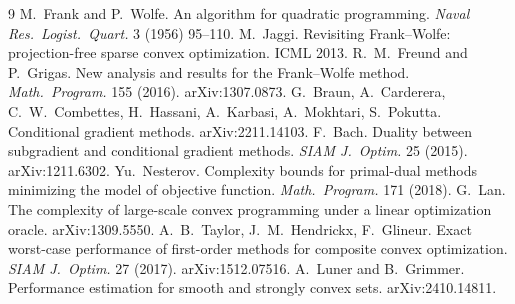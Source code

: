 \documentclass[11pt]{article}
\theoremstyle{remark}
\begin{document}
\begin{thebibliography}{9}
 M.~Frank and P.~Wolfe. An algorithm for quadratic programming.
\emph{Naval Res.\ Logist.\ Quart.} 3 (1956) 95--110.
 M.~Jaggi. Revisiting Frank--Wolfe: projection-free sparse convex
optimization. ICML 2013.
 R.~M.~Freund and P.~Grigas. New analysis and results for the
Frank--Wolfe method. \emph{Math.\ Program.} 155 (2016). arXiv:1307.0873.
 G.~Braun, A.~Carderera, C.~W.~Combettes, H.~Hassani, A.~Karbasi,
A.~Mokhtari, S.~Pokutta. Conditional gradient methods. arXiv:2211.14103.
 F.~Bach. Duality between subgradient and conditional gradient
methods. \emph{SIAM J.\ Optim.} 25 (2015). arXiv:1211.6302.
 Yu.~Nesterov. Complexity bounds for primal-dual methods minimizing
the model of objective function. \emph{Math.\ Program.} 171 (2018).
 G.~Lan. The complexity of large-scale convex programming under a
linear optimization oracle. arXiv:1309.5550.
 A.~B.~Taylor, J.~M.~Hendrickx, F.~Glineur. Exact worst-case
performance of first-order methods for composite convex optimization. \emph{SIAM J.\
Optim.} 27 (2017). arXiv:1512.07516.
 A.~Luner and B.~Grimmer. Performance estimation for smooth and
strongly convex sets. arXiv:2410.14811.
\end{thebibliography}
\end{document}
